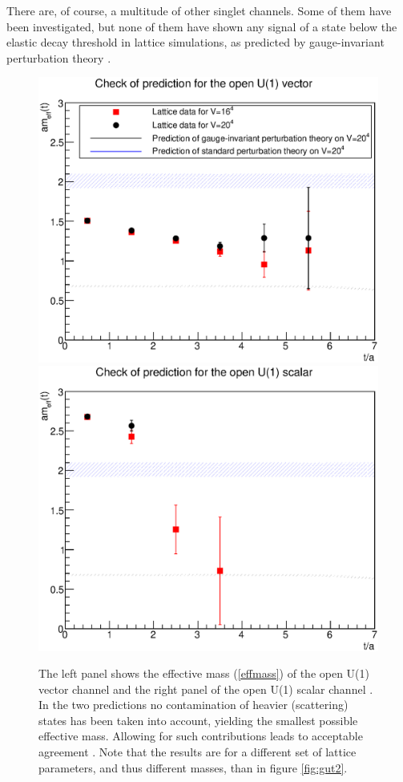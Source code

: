 \documentclass[final,twoside,12pt]{article}
\newcommand*{\pref}[1]{(\ref{#1})}
\newcommand*{\1}{1\!\!\!\bot}
\begin{document}
There are, of course, a multitude of other singlet channels. Some of them have been investigated, but none of them have shown any signal of a state below the elastic decay threshold in lattice simulations, as predicted by gauge-invariant perturbation theory \cite{Maas:unpublishedtoerek}.

\begin{figure}
\includegraphics[width=0.5\linewidth]{su3u1openv}\includegraphics[width=0.5\linewidth]{su3u1opens}
\caption{\label{fig:gutu1}The left panel shows the effective mass \pref{effmass} of the open U(1) vector channel and the right panel of the open U(1) scalar channel \cite{Maas:2017pcw,Maas:unpublishedtoerek}. In the two predictions no contamination of heavier (scattering) states has been taken into account, yielding the smallest possible effective mass. Allowing for such contributions leads to acceptable agreement \cite{Maas:unpublishedtoerek}. Note that the results are for a different set of lattice parameters, and thus different masses, than in figure \ref{fig:gut2}.}
\end{figure}
\end{document}
